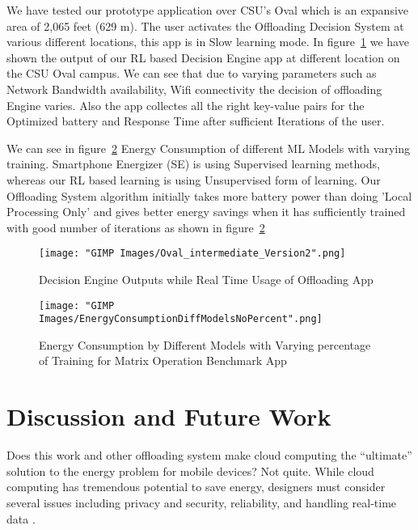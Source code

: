 \documentclass[12pt]{report}
\begin{document}
We have tested our prototype application over CSU's Oval which is an expansive area of 2,065 feet (629 m). The user activates the Offloading Decision System at various different locations, this app is in Slow learning mode.
In figure~\ref{fig:Oval_intermediate_Version2} we have shown the output of our RL based Decision Engine app at different location on the CSU Oval campus. We can see that due to varying parameters such as Network Bandwidth availability, Wifi connectivity the decision of offloading Engine varies. Also the app collectes all the right key-value pairs for the Optimized battery and Response Time after sufficient Iterations of the user. 

We can see in figure~\ref{fig:EnergyConsumptionDiffModels} Energy Consumption of different ML Models with varying training. Smartphone Energizer (SE) is using Supervised learning methods, whereas our RL based learning is using Unsupervised form of learning.
Our Offloading System algorithm initially takes more battery power than doing 'Local Processing Only' and gives better energy savings when it has sufficiently trained with good number of iterations as shown in figure~\ref{fig:EnergyConsumptionDiffModels}

\begin{figure}[h!]
  \centering
  \texttt{[image: "GIMP Images/Oval\_intermediate\_Version2".png]}
  \caption{Decision Engine Outputs while Real Time Usage of Offloading App}
  \label{fig:Oval_intermediate_Version2}
\end{figure}

\begin{figure}[h!]
  \centering
  \texttt{[image: "GIMP Images/EnergyConsumptionDiffModelsNoPercent".png]}
  \caption{Energy Consumption by Different Models with Varying percentage of Training for Matrix Operation Benchmark App}
  \label{fig:EnergyConsumptionDiffModels}
\end{figure}






\chapter{Discussion and Future Work} %
\label{chap:DiscussionAndFutureWork}
Does this work and other offloading system make cloud computing the “ultimate” solution to the energy problem for mobile devices? Not
quite. While cloud computing has tremendous potential to save energy, designers must consider several issues including privacy and security, reliability, and handling real-time data \cite{kumar2010cloud}.
\end{document}
